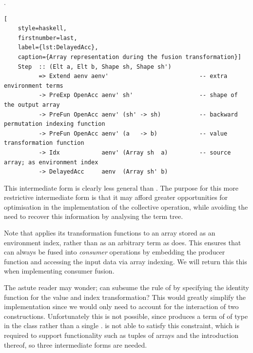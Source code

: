 .
%
\begin{lstlisting}[
    style=haskell,
    firstnumber=last,
    label={lst:DelayedAcc},
    caption={Array representation during the fusion transformation}]
    Step  :: (Elt a, Elt b, Shape sh, Shape sh')
          => Extend aenv aenv'                          -- extra environment terms
          -> PreExp OpenAcc aenv' sh'                   -- shape of the output array
          -> PreFun OpenAcc aenv' (sh' -> sh)           -- backward permutation indexing function
          -> PreFun OpenAcc aenv' (a   -> b)            -- value transformation function
          -> Idx            aenv' (Array sh  a)         -- source array; as environment index
          -> DelayedAcc     aenv  (Array sh' b)
\end{lstlisting}
%
This intermediate form is clearly less general than . The purpose
for this more restrictive intermediate form is that it may afford greater
opportunities for optimisation in the implementation of the collective
operation, while avoiding the need to recover this information by analysing the
term tree.

Note that  applies its transformation functions to an array stored
as an environment index, rather than as an arbitrary term as 
does. This ensures that  can always be fused into \emph{consumer}
operations by embedding the producer function and accessing the input data via
array indexing. We will return this this when implementing consumer fusion.

The astute reader may wonder; can  subsume the rule of
 by specifying the identity function for the value and index
transformation? This would greatly simplify the implementation since we would
only need to account for the interaction of two constructions. Unfortunately
this is not possible, since  produces a term of of type in the
class  rather than a single .  is not
able to satisfy this constraint, which is required to support functionality such
as tuples of arrays and the introduction thereof, so three intermediate forms
are needed.

